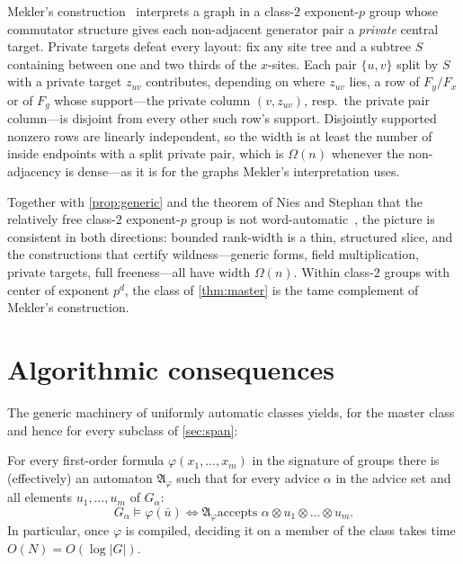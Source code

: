 \documentclass[a4paper,UKenglish,autoref,anonymous]{lipics-v2021}
\newcommand{\adv}{\alpha}
\newcommand{\conv}{\otimes}
\begin{document}
\begin{example}
\label{ex:mekler}
Mekler's construction~\cite{Mekler1981} interprets a graph in a
class-$2$ exponent-$p$ group whose commutator structure gives each
non-adjacent generator pair a \emph{private} central target. Private
targets defeat every layout: fix any site tree and a subtree $S$
containing between one and two thirds of the $x$-sites. Each pair
$\{u, v\}$ split by $S$ with a private target $z_{uv}$ contributes,
depending on where $z_{uv}$ lies, a row of $F_y/F_x$ or of $F_g$ whose
support---the private column $(v, z_{uv})$, resp.\ the private pair
column---is disjoint from every other such row's support. Disjointly
supported nonzero rows are linearly independent, so the width is at
least the number of inside endpoints with a split private pair, which
is $\Omega(n)$ whenever the non-adjacency is dense---as it is for the
graphs Mekler's interpretation uses.
\end{example}

Together with \autoref{prop:generic} and the theorem of Nies and
Stephan that the relatively free class-$2$ exponent-$p$ group is not
word-automatic~\cite{NiesStephan2023}, the picture is consistent in
both directions: bounded rank-width is a thin, structured slice, and
the constructions that certify wildness---generic forms, field
multiplication, private targets, full freeness---all have width
$\Omega(n)$. Within class-$2$ groups with center of exponent $p^d$, the
class of \autoref{thm:master} is the tame complement of Mekler's
construction.

\section{Algorithmic consequences}
\label{sec:consequences}

The generic machinery of uniformly automatic classes
\cite{AbuZaidGraedelReinhardt2017} yields, for the master class and
hence for every subclass of \autoref{sec:span}:

\begin{corollary}
\label{cor:mc}
For every first-order formula $\varphi(x_1, \dots, x_m)$ in the
signature of groups there is (effectively) an automaton
$\mathfrak{A}_\varphi$ such that for every advice $\adv$ in the advice
set and all elements $u_1, \dots, u_m$ of $G_\adv$:
\[
  G_\adv \models \varphi(\bar u) \iff \mathfrak{A}_\varphi \text{
  accepts } \adv \conv u_1 \conv \dots \conv u_m .
\]
In particular, once $\varphi$ is compiled, deciding it on a member of
the class takes time $O(N) = O(\log |G|)$.
\end{corollary}
\end{document}
